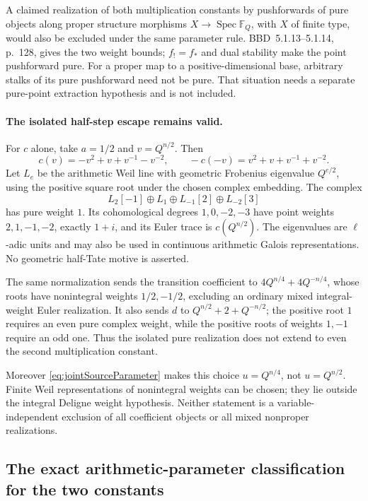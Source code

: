 \documentclass[11pt,a4paper]{article}
\theoremstyle{named}\newtheorem{finding}{Finding}[section]
\theoremstyle{definition}\newtheorem{definition}[finding]{Definition}
\theoremstyle{remark}\newtheorem{remark}[finding]{Remark}
\begin{document}
A claimed realization of both multiplication constants
by pushforwards of pure objects along proper structure
morphisms \(X\to\operatorname{Spec}\mathbb F_Q\),
with \(X\) of finite type, would also be excluded under
the same parameter rule. BBD~5.1.13--5.1.14, p.~128,
gives the two weight bounds; \(f_!=f_*\) and dual
stability make the point pushforward pure.
For a proper map to a positive-dimensional base,
arbitrary stalks of its pure pushforward need not be
pure. That situation needs a separate pure-point
extraction hypothesis and is not included.

\paragraph{The isolated half-step escape remains valid.}
For \(c\) alone, take \(a=1/2\) and \(v=Q^{n/2}\).
Then
\[
 c(v)=-v^2+v+v^{-1}-v^{-2},\qquad
 -c(-v)=v^2+v+v^{-1}+v^{-2}.
\]
Let \(L_e\) be the arithmetic Weil line with geometric
Frobenius eigenvalue \(Q^{e/2}\), using the positive
square root under the chosen complex embedding.
The complex
\begin{equation}\label{eq:jointIsolatedPureEscape}
 L_2[-1]\oplus L_1\oplus L_{-1}[2]\oplus L_{-2}[3]
\end{equation}
has pure weight \(1\).
Its cohomological degrees \(1,0,-2,-3\) have point
weights \(2,1,-1,-2\), exactly \(1+i\), and its
Euler trace is \(c(Q^{n/2})\).
The eigenvalues are \(\ell\)-adic units and may also
be used in continuous arithmetic Galois representations.
No geometric half-Tate motive is asserted.

The same normalization sends the transition coefficient
to \(4Q^{n/4}+4Q^{-n/4}\), whose roots have nonintegral
weights \(1/2,-1/2\), excluding an ordinary mixed
integral-weight Euler realization.
It also sends \(d\) to \(Q^{n/2}+2+Q^{-n/2}\);
the positive root \(1\) requires an even pure complex
weight, while the positive roots of weights \(1,-1\)
require an odd one. Thus the isolated pure realization
does not extend to even the second multiplication constant.

Moreover \eqref{eq:jointSourceParameter} makes this choice
\(u=Q^{n/4}\), not \(u=Q^{n/2}\).
Finite Weil representations of nonintegral weights can
be chosen; they lie outside the integral Deligne weight
hypothesis. Neither statement is a variable-independent
exclusion of all coefficient objects or all mixed
nonproper realizations.

\subsection{The exact arithmetic-parameter classification for the two constants}
\end{document}
